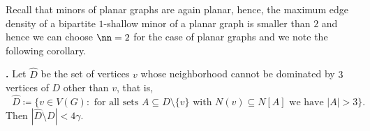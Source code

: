 Recall that minors of planar graphs are again planar, hence, the
maximum edge density of a bipartite $1$-shallow minor of a planar
graph is smaller than $2$ and hence we can choose $\nn=2$ for the case
of planar graphs and we note the following corollary.
\begin{cor}\label{lenzen-improved-planar}\hspace{-1.7mm}\textbf{.}
  Let $\hat{D}$ be the set of vertices $v$ whose neighborhood cannot
  be dominated by $3$ vertices of $D$ other than $v$, that is,
  \[
    \text{ $\hat{D}\coloneqq \{v\in V(G) :$ for all sets
      $A\subseteq D\setminus \{v\}$ with $N(v)\subseteq N[A]$ we have
      $|A|>3\}$.}
  \]
  Then $|\hat{D}\setminus D| < 4\gamma$.
\end{cor}
%
%

